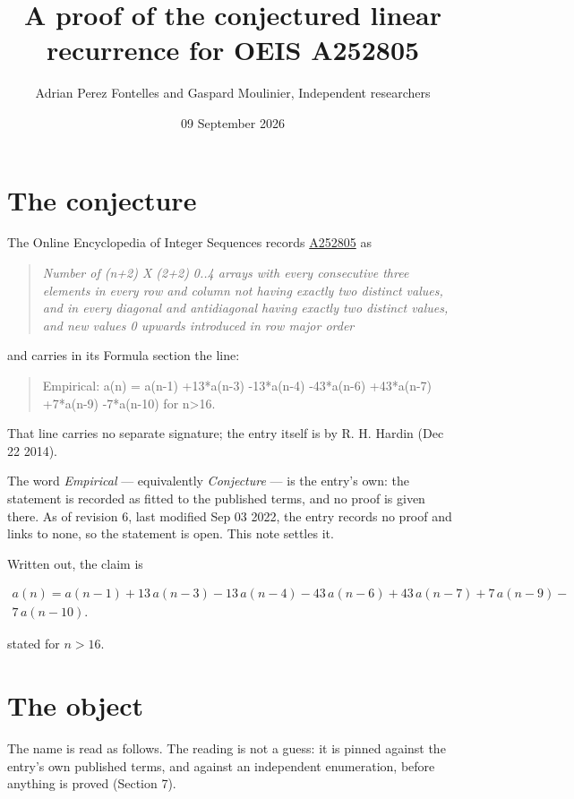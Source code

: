 \documentclass[11pt]{article}
\title{A proof of the conjectured linear recurrence for OEIS A252805}
\author{Adrian Perez Fontelles and Gaspard Moulinier, Independent researchers}
\date{09 September 2026}
\theoremstyle{definition}
\begin{document}
\maketitle
\section{The conjecture}

The Online Encyclopedia of Integer Sequences records \href{https://oeis.org/A252805}{A252805} as

\begin{quote}\itshape Number of (n+2) X (2+2) 0..4 arrays with every consecutive three elements in every row and column not having exactly two distinct values, and in every diagonal and antidiagonal having exactly two distinct values, and new values 0 upwards introduced in row major order\end{quote}

and carries in its Formula section the line:

\begin{quote}\ttfamily Empirical: a(n) = a(n-1) +13*a(n-3) -13*a(n-4) -43*a(n-6) +43*a(n-7) +7*a(n-9) -7*a(n-10) for n>16.\end{quote}

That line carries no separate signature; the entry itself is by R. H. Hardin (Dec 22 2014).

The word {\itshape Empirical} --- equivalently {\itshape Conjecture} --- is the entry's own: the statement is recorded as fitted to the published terms, and no proof is given there. As of revision 6, last modified Sep 03 2022, the entry records no proof and links to none, so the statement is open. This note settles it.

Written out, the claim is

\begin{multline*} a(n) = a(n-1) + 13\,a(n-3) - 13\,a(n-4) - 43\,a(n-6) + 43\,a(n-7) + 7\,a(n-9) - \\ 7\,a(n-10). \end{multline*}

stated for $n > 16$.

\section{The object}

The name is read as follows. The reading is not a guess: it is pinned against the entry's own published terms, and against an independent enumeration, before anything is proved (Section 7).
\end{document}
